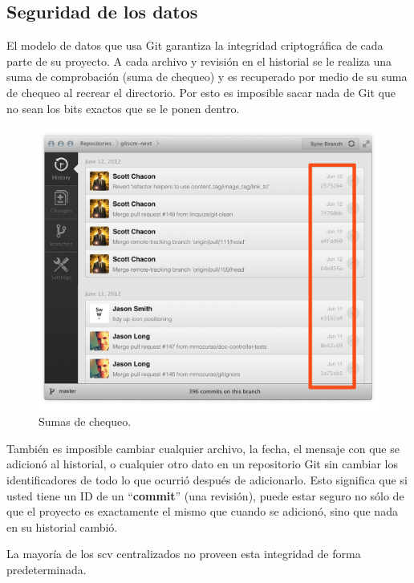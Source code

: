 \documentclass[12pt, spanish, oneside, onecolumn, a4paper]{report}
\begin{document}


\clearpage

\subsection{Seguridad de los datos}
\label{sec:dataassurance}


El modelo de datos que usa Git garantiza la integridad criptográfica de cada parte de su proyecto. A cada archivo y revisión en el historial se le realiza una suma de comprobación (suma de chequeo) y es recuperado por medio de su suma de chequeo al recrear el directorio. Por esto es imposible sacar nada de Git que no sean los bits exactos que se le ponen dentro.


\begin{figure}
  \begin{center}
  \includegraphics[width=.6\textwidth,keepaspectratio=true]{assurance.png}
  \end{center}
  \caption{Sumas de chequeo.}
\end{figure}


También es imposible cambiar cualquier archivo, la fecha, el mensaje con que se adicionó al historial, o cualquier otro dato en un repositorio Git sin cambiar los identificadores de todo lo que ocurrió después de adicionarlo. Esto significa que si usted tiene un ID de un ``\textbf{commit}'' (una revisión), puede estar seguro no sólo de que el proyecto es exactamente el mismo que cuando se adicionó, sino que nada en su historial cambió.

La mayoría de los \gls{scv} centralizados no proveen esta integridad de forma predeterminada.
\end{document}
